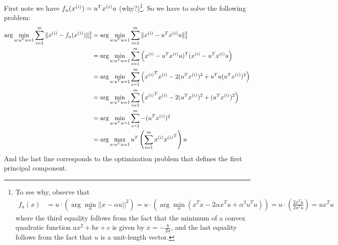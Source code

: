 \begin{answer}
First note we have $f_u(x^{(i)}) = u^Tx^{(i)} u$ (why?)\footnote{
  To see why, observe that
  \begin{align*}
    f_u(x) &= u \cdot \left(\arg \min_{\alpha} ||x - \alpha u||^2\right)
    = u \cdot \left(\arg \min_{\alpha} (x^T x - 2 \alpha x^T u + \alpha^2 u^T u)\right)
    = u \cdot \left(\frac{2x^T u}{2 u^T u}\right) = u x^T u
  \end{align*}
  where the third equality follows from the fact that the minimum of a convex quadratic function
  $ax^2 + bx + c$ is given by $x = -\frac{b}{2a}$, and the last equality follows from the fact that
  $u$ is a unit-length vector.
}. So we have to solve the following problem:
\begin{align*}
\arg\min_{u:u^Tu=1} \sum_{i=1}^m \|x^{(i)}-f_u(x^{(i)})\|_2^2
&= \arg\min_{u:u^Tu=1} \sum_{i=1}^m \|x^{(i)}-u^Tx^{(i)} u\|_2^2 \\
&= \arg\min_{u:u^Tu=1} \sum_{i=1}^m \left( x^{(i)}-u^Tx^{(i)} u)^T(x^{(i)}-u^Tx^{(i)} u \right) \\
&= \arg\min_{u:u^Tu=1} \sum_{i=1}^m \left( {x^{(i)}}^Tx^{(i)}-2(u^Tx^{(i)})^2+u^Tu(u^Tx^{(i)})^2 \right) \\
&= \arg\min_{u:u^Tu=1} \sum_{i=1}^m \left( {x^{(i)}}^Tx^{(i)}-2(u^Tx^{(i)})^2+(u^Tx^{(i)})^2 \right) \\
&= \arg\min_{u:u^Tu=1} \sum_{i=1}^m -(u^Tx^{(i)})^2 \\
&= \arg\max_{u:u^Tu=1} u^T \left(\sum_{i=1}^m x^{(i)}{x^{(i)}}^T \right) u
\end{align*}
And the last line corresponds to the optimization problem that defines the first principal component.
\end{answer}
